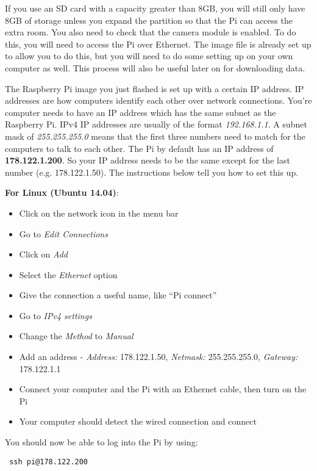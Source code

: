 \documentclass[10pt]{article}
\begin{document}
If you use an SD card with a capacity greater than 8GB, you will still only have 8GB of storage unless you expand the partition so that the Pi can
access the extra room. You also need to check that the camera module is enabled. To do this, you will need to access the Pi over Ethernet. The image file is already set up to allow you to do this, but you will need to do some setting up on your own computer as well. This process will also be useful later on for downloading data.

The Raspberry Pi image you just flashed is set up with a certain IP address. IP addresses are how computers identify each other over network connections. You're computer needs to have an IP address which has the same subnet as the Raspberry Pi. IPv4 IP addresses are usually of the format \textit{192.168.1.1}. A subnet mask of \textit{255.255.255.0} means that the first three numbers need to match for the computers to talk to each other. The Pi by default has an IP address of \textbf{178.122.1.200}. So your IP address needs to be the same except for the last number (e.g. 178.122.1.50). The instructions below tell you how to set this up. \newline

\textbf{For Linux (Ubuntu 14.04)}:

\begin{itemize}
 \item Click on the network icon in the menu bar
 \item Go to \textit{Edit Connections}
 \item Click on \textit{Add}
 \item Select the \textit{Ethernet} option
 \item Give the connection a useful name, like ``Pi connect''
 \item Go to \textit{IPv4 settings}
 \item Change the \textit{Method} to \textit{Manual}
 \item Add an address - \textit{Address:} 178.122.1.50, \textit{Netmask:} 255.255.255.0, \textit{Gateway:} 178.122.1.1
 \item Connect your computer and the Pi with an Ethernet cable, then turn on the Pi
 \item Your computer should detect the wired connection and connect 
\end{itemize}

You should now be able to log into the Pi by using:
\begin{verbatim}
 ssh pi@178.122.200
\end{verbatim}
\end{document}
